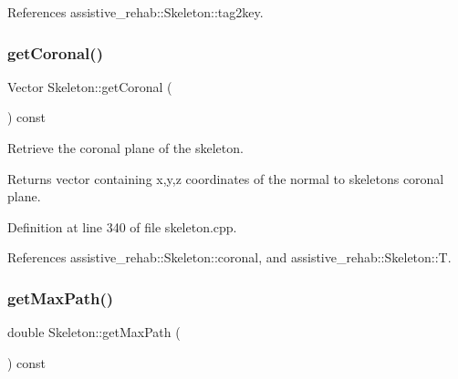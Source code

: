 References assistive\+\_\+rehab\+::\+Skeleton\+::tag2key.

\mbox{\label{classassistive__rehab_1_1Skeleton_aa241a0ac93a9ead198f985073c8935eb}} 
\subsubsection{\texorpdfstring{getCoronal()}{getCoronal()}}
{\footnotesize\ttfamily Vector Skeleton\+::get\+Coronal (\begin{DoxyParamCaption}{ }\end{DoxyParamCaption}) const\hspace{0.3cm}{\ttfamily [inherited]}}



Retrieve the coronal plane of the skeleton. 

\begin{DoxyReturn}{Returns}
vector containing x,y,z coordinates of the normal to skeleton\textquotesingle{}s coronal plane. 
\end{DoxyReturn}


Definition at line 340 of file skeleton.\+cpp.


\begin{DoxyCode}{0}

\end{DoxyCode}


References assistive\+\_\+rehab\+::\+Skeleton\+::coronal, and assistive\+\_\+rehab\+::\+Skeleton\+::T.

\mbox{\label{classassistive__rehab_1_1Skeleton_acda9030cd2ed3ad92697418a5e2cff7c}} 
\subsubsection{\texorpdfstring{getMaxPath()}{getMaxPath()}}
{\footnotesize\ttfamily double Skeleton\+::get\+Max\+Path (\begin{DoxyParamCaption}{ }\end{DoxyParamCaption}) const\hspace{0.3cm}{\ttfamily [inherited]}}



